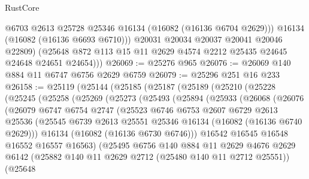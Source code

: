 \begin{lexlean}{RustCore}
\begin{coremodule}
              @6703
              @2613
              @25728
              @25346
              @16134
              (@16082 (@16136 @6704 @2629)))
            @16134
            (@16082 (@16136 @6693 @6710)))
          @20031
          @20034
          @20037
          @20041
          @20046
          @22809)
        (@25648 @872 @113 @15 @11 @2629 @4574 @2212 @25435 @24645 @24648 @24651 @24654)))
@26069 := @25276 @965
@26076 := @26069 @140 @884 @11 @6747 @6756 @2629 @6759
@26079 := @25296 @251 @16 @233
@26158 := @25119
    (@25144
      (@25185
        (@25187
          (@25189
            (@25210
              (@25228
                (@25245
                  (@25258
                    (@25269
                      (@25273
                        (@25493
                          (@25894
                            (@25933
                              (@26068
                                (@26076
                                  (@26079
                                    @6747
                                    @6754
                                    @2747
                                    (@25523
                                      @6746
                                      @6753
                                      @2607
                                      @6729
                                      @2613
                                      @25536
                                      (@25545
                                        @6739
                                        @2613
                                        @25551
                                        @25346
                                        @16134
                                        (@16082 (@16136 @6740 @2629)))
                                      @16134
                                      (@16082 (@16136 @6730 @6746)))
                                    @16542
                                    @16545
                                    @16548
                                    @16552
                                    @16557
                                    @16563)
                                  (@25495
                                    @6756
                                    @140
                                    @884
                                    @11
                                    @2629
                                    @4676
                                    @2629
                                    @6142
                                    (@25882 @140 @11 @2629 @2712 (@25480 @140 @11 @2712 @25551))
                                    (@25648

\end{coremodule}
\end{lexlean}
